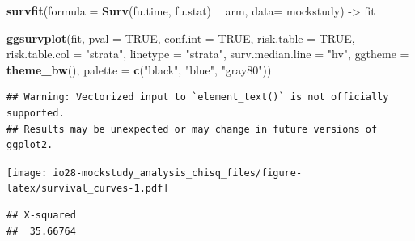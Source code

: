 \documentclass[
]{book}
\newenvironment{Shaded}{\begin{snugshade}}{\end{snugshade}}
\newcommand{\DataTypeTok}[1]{\textcolor[rgb]{0.13,0.29,0.53}{#1}}
\newcommand{\KeywordTok}[1]{\textcolor[rgb]{0.13,0.29,0.53}{\textbf{#1}}}
\newcommand{\NormalTok}[1]{#1}
\newcommand{\OperatorTok}[1]{\textcolor[rgb]{0.81,0.36,0.00}{\textbf{#1}}}
\newcommand{\OtherTok}[1]{\textcolor[rgb]{0.56,0.35,0.01}{#1}}
\newcommand{\StringTok}[1]{\textcolor[rgb]{0.31,0.60,0.02}{#1}}
\begin{document}
\begin{Shaded}
\begin{Highlighting}[]
\KeywordTok{survfit}\NormalTok{(}\DataTypeTok{formula =} \KeywordTok{Surv}\NormalTok{(fu.time, fu.stat) }\OperatorTok{~}\StringTok{ }\NormalTok{arm, }\DataTypeTok{data=}\NormalTok{ mockstudy) ->}
\NormalTok{fit}

\KeywordTok{ggsurvplot}\NormalTok{(fit,}
           \DataTypeTok{pval =} \OtherTok{TRUE}\NormalTok{, }\DataTypeTok{conf.int =} \OtherTok{TRUE}\NormalTok{,}
           \DataTypeTok{risk.table =} \OtherTok{TRUE}\NormalTok{,}
           \DataTypeTok{risk.table.col =} \StringTok{"strata"}\NormalTok{,}
           \DataTypeTok{linetype =} \StringTok{"strata"}\NormalTok{,}
           \DataTypeTok{surv.median.line =} \StringTok{"hv"}\NormalTok{,}
           \DataTypeTok{ggtheme =} \KeywordTok{theme_bw}\NormalTok{(),}
           \DataTypeTok{palette =} \KeywordTok{c}\NormalTok{(}\StringTok{"black"}\NormalTok{, }\StringTok{"blue"}\NormalTok{, }\StringTok{"gray80"}\NormalTok{)) }
\end{Highlighting}
\end{Shaded}

\begin{verbatim}
## Warning: Vectorized input to `element_text()` is not officially supported.
## Results may be unexpected or may change in future versions of ggplot2.
\end{verbatim}

\texttt{[image: io28-mockstudy\_analysis\_chisq\_files/figure-latex/survival\_curves-1.pdf]}

\begin{Shaded}
\end{Shaded}

\begin{verbatim}
## X-squared 
##  35.66764
\end{verbatim}

\begin{Shaded}
\end{Shaded}
\end{document}
